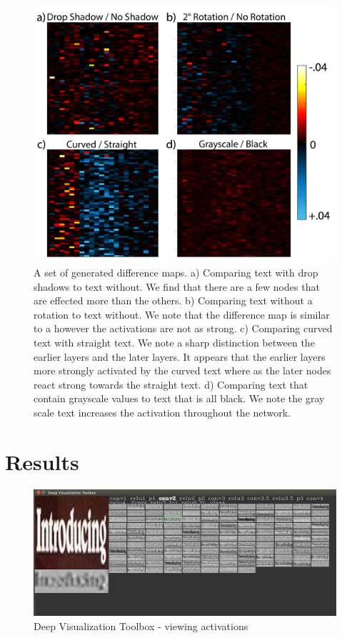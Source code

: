 \documentclass[10pt,twocolumn,letterpaper]{article}
\begin{document}
\begin{figure}
\includegraphics[width=\columnwidth]{Figures/diff_examples/diff_examples-01.png}
\caption{A set of generated difference maps. a) Comparing text with drop shadows to text without. We find that there are a few nodes that are effected more than the others. b) Comparing text without a rotation to text without. We note that the difference map is similar to a however the activations are not as strong. c) Comparing curved text with straight text. We note a sharp distinction between the earlier layers and the later layers. It appears that the earlier layers more strongly activated by the curved text where as the later nodes react strong towards the straight text. d) Comparing text that contain grayscale values to text that is all black. We note the gray scale text increases the activation throughout the network.}
\label{fig:diffexamples}
\end{figure}


\section{Results}

\begin{figure}
\includegraphics[width=\columnwidth]{Figures/deepvis/deepvis-conv2.png}
\caption{Deep Visualization Toolbox - viewing activations}
\label{fig:deepvis}
\end{figure}
\end{document}

